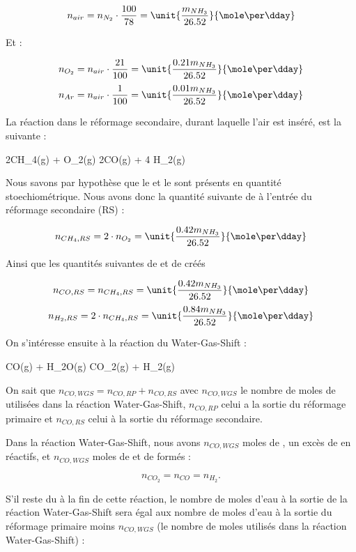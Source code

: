 $$n_{air}= n_{N_2} \cdot \frac{100}{78} = \unit{\frac{m_{NH_3}}{26.52}}{\mole\per\dday}$$ 

Et :

$$n_{O_2}= n_{air} \cdot \frac{21}{100} = \unit{\frac{0.21m_{NH_3}}{26.52}}{\mole\per\dday}$$
$$n_{Ar}= n_{air} \cdot \frac{1}{100} = \unit{\frac{0.01m_{NH_3}}{26.52}}{\mole\per\dday}$$

La réaction dans le réformage secondaire, durant laquelle l'air est inséré, est la suivante :
\begin{chemmath}
	2CH_4(g) + O_2(g) \Longrightarrow 2CO(g) + 4 H_2(g)
\end{chemmath}  

Nous savons par hypothèse que le
 et le  sont présents en quantité stoechiométrique. 
Nous avons donc la quantité suivante de  à l'entrée du réformage secondaire (RS) : 

$$n_{CH_4,RS} = 2 \cdot n_{O_2} = \unit{\frac{0.42m_{NH_3}}{26.52}}{\mole\per\dday}$$

Ainsi que les quantités suivantes de  et de  créés 

$$n_{CO,RS} = n_{CH_4,RS} =  \unit{\frac{0.42m_{NH_3}}{26.52}} {\mole\per\dday}$$
$$n_{H_2,RS} = 2 \cdot n_{CH_4,RS} =  \unit{\frac{0.84m_{NH_3}}{26.52}}{\mole\per\dday}$$

On s'intéresse ensuite à la réaction du Water-Gas-Shift : 

\begin{chemmath}
	CO(g) + H_2O(g) \Longrightarrow CO_2(g) + H_2(g)
\end{chemmath} 

On sait que $n_{CO,WGS} = n_{CO,RP} + n_{CO,RS}$ avec $n_{CO,WGS}$ 
le nombre de moles de  utilisées dans la réaction Water-Gas-Shift,
$n_{CO,RP}$ celui a la sortie du réformage primaire et $n_{CO,RS}$ celui 
à la sortie du réformage secondaire.

Dans la réaction Water-Gas-Shift, nous avons $n_{CO,WGS}$ moles de ,
un excès de  en réactifs, et $n_{CO,WGS}$ moles de  et de 
 formés :

$$n_{CO_2} = n_{CO} = n_{H_2}.$$

S'il reste du  à la fin de cette réaction, le nombre de moles d'eau
à la sortie de la réaction Water-Gas-Shift sera égal aux nombre de moles d'eau à la
sortie du réformage primaire moins $n_{CO,WGS}$ (le nombre de moles utilisés dans 
la réaction Water-Gas-Shift) :

